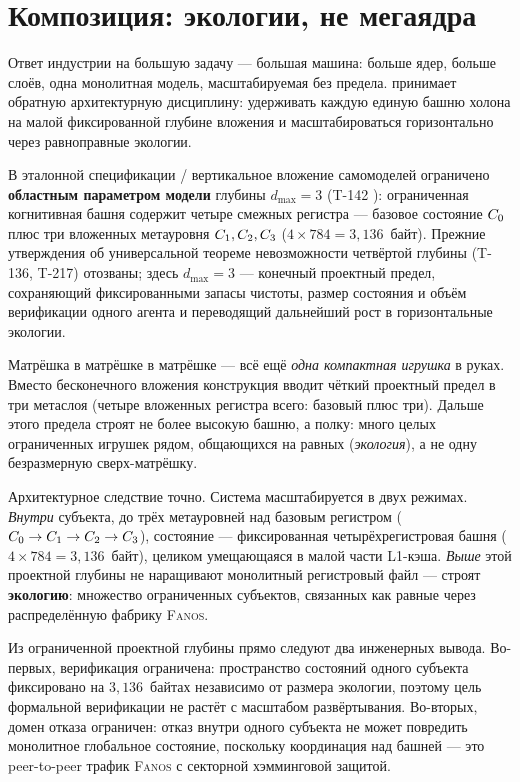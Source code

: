 \section{Композиция: экологии, не мегаядра}
\label{sec:composition}

Ответ индустрии на большую задачу --- большая машина: больше ядер, больше слоёв,
одна монолитная модель, масштабируемая без предела. \TALOS{} принимает обратную
архитектурную дисциплину: удерживать каждую единую башню холона на малой
фиксированной глубине вложения и масштабироваться горизонтально через
равноправные экологии.

\begin{claimbox}
В эталонной спецификации \TALOS{}/\SYNARC{} вертикальное вложение самомоделей
ограничено \textbf{областным параметром модели} глубины $d_{\max}=3$ (T-142
): ограниченная когнитивная башня содержит четыре смежных регистра
\DM{} --- базовое состояние $C_0$ плюс три вложенных метауровня
$C_1,C_2,C_3$ ($4\times 784=3{,}136$~байт). Прежние утверждения об
универсальной теореме невозможности четвёртой глубины (T-136, T-217) отозваны;
здесь $d_{\max}=3$ --- конечный проектный предел, сохраняющий фиксированными
запасы чистоты, размер состояния и объём верификации одного агента и переводящий
дальнейший рост в горизонтальные экологии.
\end{claimbox}

\begin{zerobox}
Матрёшка в матрёшке в матрёшке --- всё ещё \emph{одна компактная игрушка} в
руках. Вместо бесконечного вложения конструкция вводит чёткий проектный предел в
три метаслоя (четыре вложенных регистра всего: базовый плюс три). Дальше этого
предела строят не более высокую башню, а полку: много целых ограниченных
игрушек рядом, общающихся на равных (\emph{экология}), а не одну безразмерную
сверх-матрёшку.
\end{zerobox}

Архитектурное следствие точно. Система \TALOS{} масштабируется в двух режимах.
\emph{Внутри} субъекта, до трёх метауровней над базовым регистром
($C_0\to C_1\to C_2\to C_3$), состояние --- фиксированная
четырёхрегистровая башня ($4\times784=3{,}136$~байт), целиком умещающаяся в
малой части L1-кэша. \emph{Выше} этой проектной глубины не наращивают
монолитный регистровый файл --- строят \textbf{экологию}: множество ограниченных
субъектов, связанных как равные через распределённую фабрику \textsc{Fanos}.

Из ограниченной проектной глубины прямо следуют два инженерных вывода. Во-первых,
верификация ограничена: пространство состояний одного субъекта фиксировано на
$3{,}136$~байтах независимо от размера экологии, поэтому цель формальной
верификации не растёт с масштабом развёртывания. Во-вторых, домен отказа
ограничен: отказ внутри одного субъекта не может повредить монолитное глобальное
состояние, поскольку координация над башней --- это peer-to-peer трафик
\textsc{Fanos} с секторной хэмминговой защитой.
